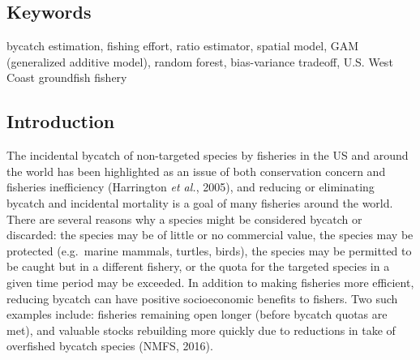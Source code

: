 \documentclass[]{article}
\begin{document}
\hypertarget{keywords}{%
\subsection{Keywords}\label{keywords}}

bycatch estimation, fishing effort, ratio estimator, spatial model, GAM
(generalized additive model), random forest, bias-variance tradeoff,
U.S. West Coast groundfish fishery

\hypertarget{introduction}{%
\subsection{Introduction}\label{introduction}}

The incidental bycatch of non-targeted species by fisheries in the US
and around the world has been highlighted as an issue of both
conservation concern and fisheries inefficiency (Harrington \emph{et
al.}, 2005), and reducing or eliminating bycatch and incidental
mortality is a goal of many fisheries around the world. There are
several reasons why a species might be considered bycatch or discarded:
the species may be of little or no commercial value, the species may be
protected (e.g.~marine mammals, turtles, birds), the species may be
permitted to be caught but in a different fishery, or the quota for the
targeted species in a given time period may be exceeded. In addition to
making fisheries more efficient, reducing bycatch can have positive
socioeconomic benefits to fishers. Two such examples include: fisheries
remaining open longer (before bycatch quotas are met), and valuable
stocks rebuilding more quickly due to reductions in take of overfished
bycatch species (NMFS, 2016).
\end{document}

